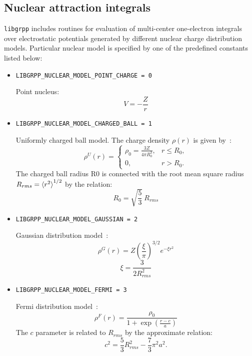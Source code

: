 \documentclass[12pt]{article}
\begin{document}
\subsection{Nuclear attraction integrals}

\texttt{libgrpp} includes routines for evaluation of multi-center one-electron integrals over electrostatic potentials generated by different nuclear charge distribution models. Particular nuclear model is specified by one of the
predefined constants listed below:

\begin{itemize}
\item \texttt{LIBGRPP\_NUCLEAR\_MODEL\_POINT\_CHARGE = 0}

Point nucleus:
\begin{equation}
V = -\frac{Z}{r}
\end{equation}

\item \texttt{LIBGRPP\_NUCLEAR\_MODEL\_CHARGED\_BALL = 1}

Uniformly charged ball model. The charge density $\rho(r)$ is given by~\cite{Visscher:97}:
\begin{equation}
\rho^U(r) = \begin{cases}
\rho_0 = \frac{3Z}{4\pi R^3_0}, & r \le R_0, \\
0, & r > R_0.
\end{cases}
\end{equation}
The charged ball radius R0 is connected with the root mean square radius $R_{rms} = \braket{r^2}^{1/2}$ by the relation:
\begin{equation}
R_0 = \sqrt{\frac{5}{3}}\ R_{rms}
\end{equation}

\item \texttt{LIBGRPP\_NUCLEAR\_MODEL\_GAUSSIAN = 2}

Gaussian distribution model~\cite{Visscher:97}:
\begin{equation}
\rho^G(r) = Z \left( \frac{\xi}{\pi} \right)^{3/2} e^{-\xi r^2}
\end{equation}
\begin{equation}
\xi = \frac{3}{2 R_{rms}^2}
\end{equation}

\item \texttt{LIBGRPP\_NUCLEAR\_MODEL\_FERMI = 3}

Fermi distribution model~\cite{Visscher:97,Parpia:92,Mosyagin:20}:
\begin{equation}
\rho^F(r) = \frac{\rho_0}{1 + \exp(\frac{r-c}{a})}
\end{equation}
The $c$ parameter is related to $R_{rms}$ by the approximate relation:
\begin{equation}
c^2 = \frac{5}{3}R^2_{rms} - \frac{7}{3}\pi^2 a^2.
\end{equation}


\end{itemize}
\end{document}
